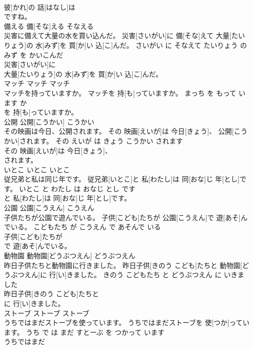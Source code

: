 \documentclass[8pt]{extreport}
\begin{document}
\begin{CJK}{UTF8}{min}
\\	彼[かれ]の 話[はなし]は
\\	ですね。			
\\	備える	備[そな]える	そなえる	
\\	災害に備えて大量の水を買い込んだ。	災害[さいがい]に 備[そな]えて 大量[たいりょう]の 水[みず]を 買[か]い 込[こ]んだ。	さいがい に そなえて たいりょう の みず を かいこんだ	
\\	災害[さいがい]に
\\	大量[たいりょう]の 水[みず]を 買[か]い 込[こ]んだ。			
\\	マッチ	マッチ	マッチ	
\\	マッチを持っていますか。	マッチを 持[も]っていますか。	まっち を もって います か	
\\	を 持[も]っていますか。			
\\	公開	公開[こうかい]	こうかい	
\\	その映画は今日、公開されます。	その 映画[えいが]は 今日[きょう]、 公開[こうかい]されます。	その えいが は きょう こうかい されます	
\\	その 映画[えいが]は 今日[きょう]、
\\	されます。			
\\	いとこ	いとこ	いとこ	
\\	従兄弟と私は同じ年です。	従兄弟[いとこ]と 私[わたし]は 同[おな]じ 年[とし]です。	いとこ と わたし は おなじ とし です	
\\	と 私[わたし]は 同[おな]じ 年[とし]です。			
\\	公園	公園[こうえん]	こうえん	
\\	子供たちが公園で遊んでいる。	子供[こども]たちが 公園[こうえん]で 遊[あそ]んでいる。	こどもたち が こうえん で あそんで いる	
\\	子供[こども]たちが
\\	で 遊[あそ]んでいる。			
\\	動物園	動物園[どうぶつえん]	どうぶつえん	
\\	昨日子供たちと動物園に行きました。	昨日子供[きのう こども]たちと 動物園[どうぶつえん]に 行[い]きました。	きのう こどもたち と どうぶつえん に いきました	
\\	昨日子供[きのう こども]たちと
\\	に 行[い]きました。			
\\	ストーブ	ストーブ	ストーブ	
\\	うちではまだストーブを使っています。	うちではまだストーブを 使[つか]っています。	うち で は まだ すとーぶ を つかって います	
\\	うちではまだ

\end{CJK}
\end{document}
